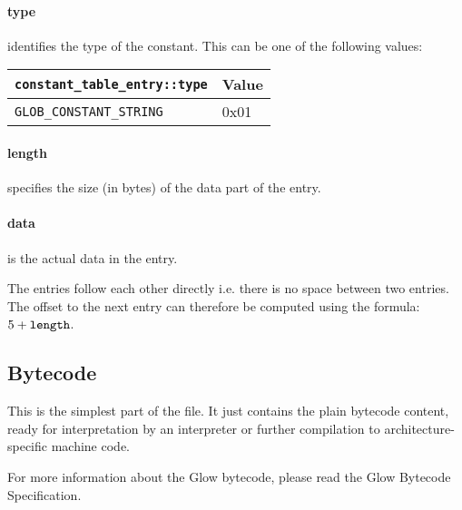 \documentclass[12pt]{article}
\begin{document}
\paragraph{type} identifies the type of the constant. This can be one of the following values:

\begin{tabular}{| l | l |}
\hline
\verb|constant_table_entry::type| & Value \\
\hline \hline
\verb|GLOB_CONSTANT_STRING| & 0x01 \\
\hline
\end{tabular}

\paragraph{length} specifies the size (in bytes) of the data part of the entry.

\paragraph{data} is the actual data in the entry.

The entries follow each other directly i.e. there is no space between two entries. The offset
to the next entry can therefore be computed using the formula: \(5 + \verb|length|\).


\subsection*{Bytecode}

This is the simplest part of the file. It just contains the plain bytecode content, ready for interpretation
by an interpreter or further compilation to architecture-specific machine code.

For more information about the Glow bytecode, please read the Glow Bytecode Specification.
\end{document}
